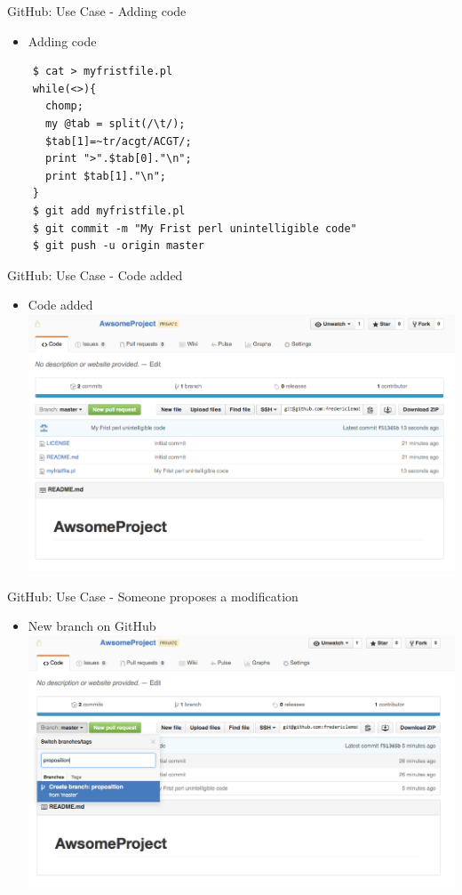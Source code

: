 \begin{frame}[fragile]{GitHub: Use Case - Adding code}
  \begin{itemize}
  \item Adding code
  \end{itemize}
  \begin{lstlisting}
    $ cat > myfristfile.pl
    while(<>){
      chomp;
      my @tab = split(/\t/);
      $tab[1]=~tr/acgt/ACGT/;
      print ">".$tab[0]."\n";
      print $tab[1]."\n";
    }
    $ git add myfristfile.pl
    $ git commit -m "My Frist perl unintelligible code"
    $ git push -u origin master
    \end{lstlisting}
\end{frame}

\begin{frame}{GitHub: Use Case - Code added}
  \begin{itemize}
  \item Code added
    \includegraphics[width=\textwidth]{images/hosting_services_use_case_3.png}
  \end{itemize}
\end{frame}

\begin{frame}{GitHub: Use Case - Someone proposes a modification}
  \begin{itemize}
  \item New branch on GitHub
    \includegraphics[width=\textwidth]{images/hosting_services_use_case_4.png}
  \end{itemize}
\end{frame}

